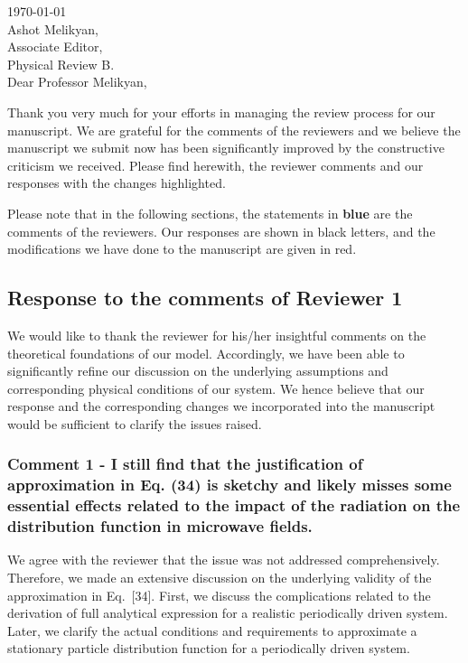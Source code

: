\documentclass{article}
\begin{document}

\today\\

Ashot Melikyan,\\
Associate Editor,\\
Physical Review B.\\

Dear Professor Melikyan,

Thank you very much for your efforts in managing the review process for our manuscript. We are grateful for the comments of the reviewers and we believe the manuscript we submit now has been significantly improved by the constructive criticism we received. Please find herewith, the reviewer comments and our responses with the changes highlighted.

Please note that in the following sections, the statements in {\color{RoyalBlue} \textbf{blue}} are the comments of the reviewers. Our responses are shown in black letters, and the modifications we have done to the manuscript are given in {\color{Red} red}.

\subsection*{Response to the comments of Reviewer 1}

We would like to thank the reviewer for his/her insightful comments on the theoretical foundations of our model. Accordingly, we have been able to significantly refine our discussion on the underlying assumptions and corresponding physical conditions of our system. We hence believe that our response and the corresponding changes we incorporated into the manuscript would be sufficient to clarify the issues raised.

\subsubsection*{Comment 1 -
\color{RoyalBlue} I still find that the justification of approximation in Eq. (34) is sketchy and likely misses some essential effects related to the impact of the radiation on the distribution function in microwave fields.}

We agree with the reviewer that the issue was not addressed comprehensively. Therefore, we made an extensive discussion on the underlying validity of the approximation in Eq.~[34]. First, we discuss the complications related to the derivation of full analytical expression for a realistic periodically driven system. Later, we clarify the actual conditions and requirements to approximate a stationary particle distribution function for a periodically driven system.
\end{document}
